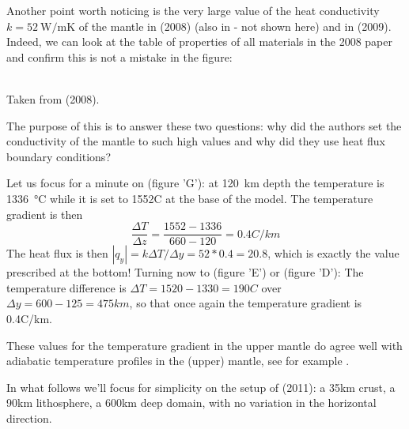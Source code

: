 Another point worth noticing is the very large value of the heat conductivity 
$k=52~\si{\watt\per\meter\kelvin}$
of the mantle in \textcite{wabj08} (2008) (also in \textcite{wabj08b,wabj08c} - not shown here) and 
in \textcite{bejb09} (2009).
Indeed, we can look at the table of properties of all materials in the 2008 paper and confirm 
this is not a mistake in the figure:

\begin{center}
\\
{\captionfont Taken from \textcite{wabj08} (2008).}
\end{center}

The purpose of this \stone is to answer these two questions: why did the authors set the 
conductivity of the mantle to such high values and why did they use heat flux boundary conditions?

Let us focus for a minute on \textcite{bejb09} (figure 'G'): at \SI{120}{\km} depth the temperature is \SI{1336}{\celsius}
while it is set to 1552C at the base of the model. The temperature gradient is then 
\[
\frac{\Delta T}{\Delta z} = \frac{1552-1336}{660-120} = 0.4 C/km
\]
The heat flux is then $|q_y|=k \Delta T/\Delta y = 52*0.4=20.8$, which is 
exactly the value prescribed at the bottom!
Turning now to \textcite{hube14} (figure 'E') or \textcite{hube11} (figure 'D'): 
The temperature difference is 
$\Delta T=1520-1330=190C$ over $\Delta y=600-125=475km$, so that once again the 
temperature gradient is 0.4C/km.

These values for the temperature gradient in the upper mantle do agree well 
with adiabatic temperature profiles in the (upper) mantle, see for example 
\textcite{kayy10}. 

In what follows we'll focus for simplicity 
on the setup of \textcite{hube11} (2011): a 35km crust, a 90km lithosphere, 
a 600km deep domain, with no variation in the horizontal direction. 



